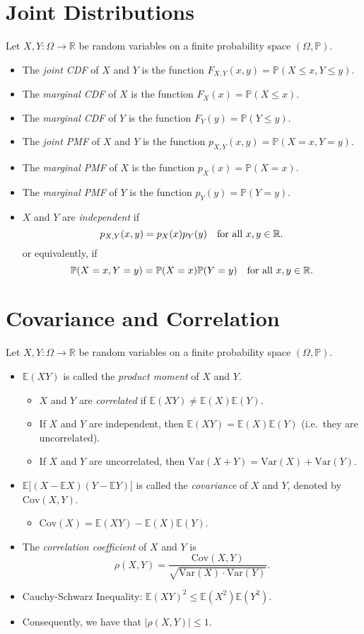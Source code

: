 \documentclass[lecture]{csm}
\newcommand{\prob}{\mathbb{P}}
\newcommand{\expe}{\mathbb{E}}
\newcommand{\var}{\text{Var}}
\newcommand{\cov}{\text{Cov}}
\newcommand{\R}{\mathbb{R}}
\def\it{\item}
\def\bit{\begin{itemize}}
\def\eit{\end{itemize}}
\begin{document}
\maketitle

\setcounter{section}{9}
\newpage
\section{Joint Distributions}
Let $X,Y:\Omega\to\R$ be random variables on a finite probability space $(\Omega,\prob)$.
\bit
\it The \emph{joint CDF} of $X$ and $Y$ is the function $F_{X,Y}(x,y)=\prob(X\leq x, Y\leq y)$.
\it The \emph{marginal CDF} of $X$ is the function $F_X(x)=\prob(X\leq x)$.
\it The \emph{marginal CDF} of $Y$ is the function $F_Y(y)=\prob(Y\leq y)$.
\eit
\vspace*{1ex}
\bit
\it The \emph{joint PMF} of $X$ and $Y$ is the function $p_{X,Y}(x,y)=\prob(X=x,Y=y)$.
\it The \emph{marginal PMF} of $X$ is the function $p_X(x)=\prob(X=x)$.
\it The \emph{marginal PMF} of $Y$ is the function $p_Y(y)=\prob(Y=y)$.
\eit
\vspace*{1ex}
\bit
\it $X$ and $Y$ are \emph{independent} if
\[
p_{X,Y}(x,y) = p_X(x)p_Y(y)\text{\quad for all $x,y\in\R$.}
\]
or equivalently, if
\[
\prob(X=x,Y=y)=\prob(X=x)\prob(Y=y)\text{\quad for all $x,y\in\R$.}
\]
\eit

\newpage
\section{Covariance and Correlation}
Let $X,Y:\Omega\to\R$ be random variables on a finite probability space $(\Omega,\prob)$.
\bit
\it $\expe(XY)$ is called the \emph{product moment} of $X$ and $Y$.
	\bit
	\it $X$ and $Y$ are \emph{correlated} if $\expe(XY) \neq \expe(X)\expe(Y)$.
	\it If $X$ and $Y$ are independent, then $\expe(XY) = \expe(X)\expe(Y)$ (i.e.\ they are uncorrelated).
	\it If $X$ and $Y$ are uncorrelated, then $\var(X+Y) = \var(X)+\var(Y)$.
	\eit
\it $\expe\big[(X-\expe X)(Y-\expe Y)\big]$ is called the \emph{covariance} of $X$ and $Y$, denoted by $\cov(X,Y)$.
	\bit
	\it $\cov(X) = \expe(XY) - \expe(X)\expe(Y)$.
	\eit
\it The \emph{correlation coefficient} of $X$ and $Y$ is 
\[
\rho(X,Y) = \frac{\cov(X,Y)}{\sqrt{\var(X)\cdot\var(Y)}}.
\]
\it Cauchy-Schwarz Inequality: $\expe(XY)^2 \leq \expe(X^2)\expe(Y^2)$.
\it Consequently, we have that $|\rho(X,Y)|\leq 1$.
\eit
\end{document}
